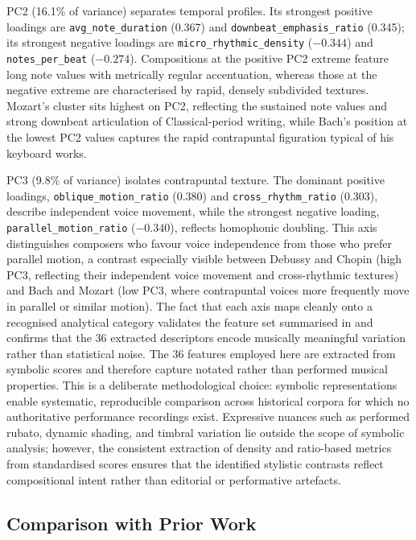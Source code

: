\documentclass[]{interact}
\theoremstyle{plain}
\theoremstyle{definition}
\theoremstyle{remark}
\begin{document}
PC2 (16.1\% of variance) separates temporal profiles. Its strongest positive
loadings are \texttt{avg\_note\_duration} (0.367) and
\texttt{downbeat\_emphasis\_ratio} (0.345); its strongest negative loadings
are \texttt{micro\_rhythmic\_density} ($-0.344$) and
\texttt{notes\_per\_beat} ($-0.274$). Compositions at the positive PC2
extreme feature long note values with metrically regular accentuation,
whereas those at the negative extreme are characterised by rapid, densely
subdivided textures. Mozart's cluster sits highest on PC2, reflecting the
sustained note values and strong downbeat articulation of Classical-period
writing, while Bach's position at the lowest PC2 values captures the rapid
contrapuntal figuration typical of his keyboard works.

PC3 (9.8\% of variance) isolates contrapuntal texture. The dominant positive
loadings, \texttt{oblique\_motion\_ratio} (0.380) and
\texttt{cross\_rhythm\_ratio} (0.303), describe independent voice movement,
while the strongest negative loading, \texttt{parallel\_motion\_ratio}
($-0.340$), reflects homophonic doubling. This axis distinguishes composers
who favour voice independence from those who prefer parallel motion, a
contrast especially visible between Debussy and Chopin (high PC3, reflecting
their independent voice movement and cross-rhythmic textures) and Bach and
Mozart (low PC3, where contrapuntal voices more frequently move in parallel
or similar motion).
The fact that each axis maps cleanly onto a recognised analytical category
validates the feature set summarised in  and confirms
that the 36 extracted descriptors encode musically meaningful variation
rather than statistical noise.
The 36 features employed here are extracted from symbolic scores and
therefore capture notated rather than performed musical properties. This
is a deliberate methodological choice: symbolic representations enable
systematic, reproducible comparison across historical corpora for which
no authoritative performance recordings exist. Expressive nuances such as
performed rubato, dynamic shading, and timbral variation lie outside the
scope of symbolic analysis; however, the consistent extraction of density
and ratio-based metrics from standardised scores ensures that the
identified stylistic contrasts reflect compositional intent rather than
editorial or performative artefacts.

\subsection{Comparison with Prior Work}
\end{document}
